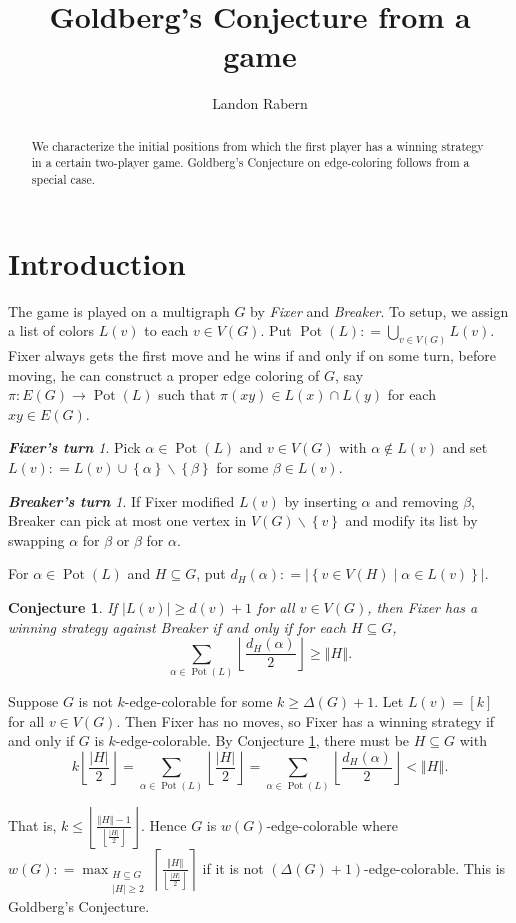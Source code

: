 \documentclass[12pt]{amsart}
\title{Goldberg's Conjecture from a game}
\author{Landon Rabern}
\theoremstyle{plain}
\newtheorem{conj}[thm]{Conjecture}
\theoremstyle{definition}
\theoremstyle{remark}
\newtheorem*{FixerMove}{\bf {Fixer's turn}}
\newtheorem*{BreakerMove}{\bf {Breaker's turn}}
\newcommand{\set}[1]{\left\{ #1 \right\}}
\newcommand{\setb}[3]{\left\{ #1 \in #2 \mid #3 \right\}}
\newcommand{\card}[1]{\left|#1\right|}
\newcommand{\size}[1]{\left\Vert#1\right\Vert}
\newcommand{\ceil}[1]{\left\lceil#1\right\rceil}
\newcommand{\floor}[1]{\left\lfloor#1\right\rfloor}
\newcommand{\func}[3]{#1\colon #2 \rightarrow #3}
\newcommand{\irange}[1]{\left[#1\right]}
\newcommand{\DefinedAs}{\mathrel{\mathop:}=}
\newcommand{\pot}{\operatorname{Pot}}
\begin{document}
\maketitle
\begin{abstract}
We characterize the initial positions from which the first player has a winning
strategy in a certain two-player game.  Goldberg's Conjecture on edge-coloring follows from a special case.
\end{abstract}

\section{Introduction}
The game is played on a multigraph $G$ by \emph{Fixer} and
\emph{Breaker}.  To setup, we assign a list of colors $L(v)$ to each
$v \in V(G)$. Put  $\pot(L) \DefinedAs \bigcup_{v \in V(G)} L(v)$.
Fixer always gets the first move and he wins if and only if on some turn, before moving, he can construct a proper edge coloring of $G$, say $\func{\pi}{E(G)}{\pot(L)}$ such that
$\pi(xy) \in L(x) \cap L(y)$ for each $xy \in E(G)$.

\begin{FixerMove}
Pick $\alpha \in \pot(L)$ and $v \in V(G)$ with $\alpha \not \in L(v)$ and set $L(v)
\DefinedAs L(v) \cup \set{\alpha} \smallsetminus \set{\beta}$ for some $\beta
\in L(v)$.
\end{FixerMove}

\begin{BreakerMove}
If Fixer modified $L(v)$ by inserting $\alpha$ and removing $\beta$, Breaker can
pick at most one vertex in $V(G) \smallsetminus \set{v}$ and modify its list by
swapping $\alpha$ for $\beta$ or $\beta$ for $\alpha$.
\end{BreakerMove}

For $\alpha \in \pot(L)$ and $H \subseteq G$, put $d_H(\alpha) \DefinedAs \card{\setb{v}{V(H)}{\alpha \in L(v)}}$.

\begin{conj}\label{MainTheorem}
If $|L(v)| \ge d(v) + 1$ for all $v \in V(G)$, then Fixer has a winning strategy against Breaker if and only if for each $H \subseteq G$,
\[\sum_{\alpha \in \pot(L)} \floor{\frac{d_H(\alpha)}{2}} \ge \size{H}.\]
\end{conj}

Suppose $G$ is not $k$-edge-colorable for some $k \ge \Delta(G) + 1$. Let $L(v) = \irange{k}$ for all $v \in V(G)$.  Then Fixer has no moves, so Fixer has a winning strategy if and only if $G$ is $k$-edge-colorable.  By Conjecture \ref{MainTheorem}, there must be $H \subseteq G$ with 
\[k\floor{\frac{|H|}{2}} = \sum_{\alpha \in \pot(L)} \floor{\frac{|H|}{2}} = \sum_{\alpha \in \pot(L)} \floor{\frac{d_H(\alpha)}{2}} < \size{H}.\] 

\noindent That is, $k \le \floor{\frac{\size{H} - 1}{\floor{\frac{|H|}{2}}}}$.  Hence $G$ is $w(G)$-edge-colorable where $w(G) \DefinedAs \max_{\substack{H \subseteq G\\|H| \ge 2}}\ceil{\frac{\size{H}}{\floor{\frac{|H|}{2}}}}$ if it is not $(\Delta(G) + 1)$-edge-colorable.  This is Goldberg's Conjecture.



\end{document}
